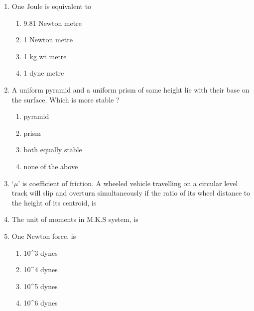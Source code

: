 \documentclass[11pt,a4paper]{article}
\begin{document}
\begin{enumerate}
\begin{enumerate*}[itemjoin=\qquad, label=\Alph*.]
\end{enumerate*}
\item{One Joule is equivalent to}
\begin{enumerate}[label=\Alph*.]
\item{9.81 Newton metre}
\item{1 Newton metre}
\item{1 kg wt metre}
\item{1 dyne metre}
\end{enumerate}
\item{A uniform pyramid and a uniform prism of same height lie with their base on the surface. Which is more stable ?}
\begin{enumerate}[label=\Alph*.]
\item{pyramid}
\item{prism}
\item{both equally stable}
\item{none of the above}
\end{enumerate}
\item{`$\mu$' is coefficient of friction. A wheeled vehicle travelling on a circular level track will slip and overturn simultaneously if the ratio of its wheel distance to the height of its centroid, is
}
\\
\item{The unit of moments in M.K.S system, is}
\\
\item{One Newton force, is}
\begin{enumerate}[label=\Alph*.]
\item{10\^{}3 dynes}
\item{10\^{}4 dynes}
\item{10\^{}5 dynes}
\item{10\^{}6 dynes}
\end{enumerate}

\end{enumerate}
\end{document}
